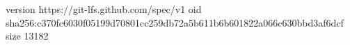 version https://git-lfs.github.com/spec/v1
oid sha256:c370fc6030f05199d70801cc259db72a5b611b6b601822a066c630bbd3af6dcf
size 13182
